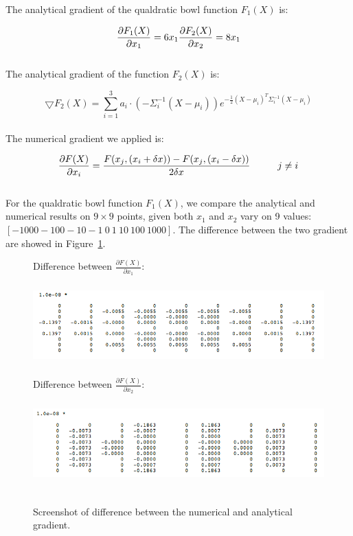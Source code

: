 The analytical gradient of the qualdratic bowl function $F_1(X)$ is:

\begin{equation}
\frac{\partial F_1(X)}{\partial x_1} = 6 x_1\\
\frac{\partial F_2(X)}{\partial x_2} = 8 x_1\\
\end{equation}\\
The analytical gradient of the function $F_2(X)$ is:

\begin{equation}
\bigtriangledown F_2(X) = \sum_{i=1}^3 a_i \cdot (-\Sigma_i ^{-1} (X - \mu_i)) e^{-\frac{1}{2} (X - \mu_i)^T \Sigma_i ^{-1} (X - \mu_i)}
\end{equation}\\
The numerical gradient we applied is:

\begin{equation}
\frac{\partial F(X)}{\partial x_i} = \frac{F(x_j,(x_i+\delta x)) - F(x_j,(x_i-\delta x))} {2 \delta x} \hspace{10 mm}  j\neq i
\end{equation}\\


For the qualdratic bowl function $F_1(X)$, we compare the analytical and numerical results on $9 \times 9$ points, given both $x_1$  and $x_2$ vary on 9 values: $[-1000 -100 -10 -1\  0\  1\  10\  100\   1000]$.
The difference between the two gradient are showed in Figure~\ref{fig:gradientCompare}.

\begin{figure}[h]

Difference between $\frac{\partial F(X)}{\partial x_1} $: \\
\includegraphics[height=1.5in]{figures/p13_compare1} 
Difference between $\frac{\partial F(X)}{\partial x_2} $: \\
\includegraphics[height=1.5in]{figures/p13_compare2} 
    \caption{Screenshot of difference between the numerical and analytical gradient. }
    \label{fig:gradientCompare}
\end{figure}

